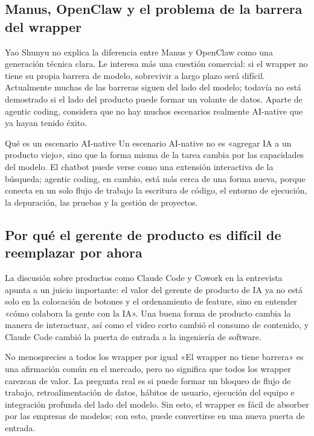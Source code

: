\subsection{Manus, OpenClaw y el problema de la barrera del wrapper}

Yao Shunyu no explica la diferencia entre Manus y OpenClaw como una generación técnica clara. Le interesa más una cuestión comercial: si el wrapper no tiene su propia barrera de modelo, sobrevivir a largo plazo será difícil. Actualmente muchas de las barreras siguen del lado del modelo; todavía no está demostrado si el lado del producto puede formar un volante de datos. Aparte de agentic coding, considera que no hay muchos escenarios realmente AI-native que ya hayan tenido éxito.

\begin{knowledgebox}{Qué es un escenario AI-native}
Un escenario AI-native no es «agregar IA a un producto viejo», sino que la forma misma de la tarea cambia por las capacidades del modelo. El chatbot puede verse como una extensión interactiva de la búsqueda; agentic coding, en cambio, está más cerca de una forma nueva, porque conecta en un solo flujo de trabajo la escritura de código, el entorno de ejecución, la depuración, las pruebas y la gestión de proyectos.
\end{knowledgebox}

\subsection{Por qué el gerente de producto es difícil de reemplazar por ahora}

La discusión sobre productos como Claude Code y Cowork en la entrevista apunta a un juicio importante: el valor del gerente de producto de IA ya no está solo en la colocación de botones y el ordenamiento de feature, sino en entender «cómo colabora la gente con la IA». Una buena forma de producto cambia la manera de interactuar, así como el video corto cambió el consumo de contenido, y Claude Code cambió la puerta de entrada a la ingeniería de software.

\begin{warningbox}{No menosprecies a todos los wrapper por igual}
«El wrapper no tiene barrera» es una afirmación común en el mercado, pero no significa que todos los wrapper carezcan de valor. La pregunta real es si puede formar un bloqueo de flujo de trabajo, retroalimentación de datos, hábitos de usuario, ejecución del equipo e integración profunda del lado del modelo. Sin esto, el wrapper es fácil de absorber por las empresas de modelos; con esto, puede convertirse en una nueva puerta de entrada.
\end{warningbox}

